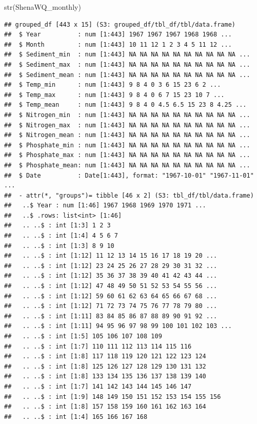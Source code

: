 \documentclass[
  12pt,
]{article}
\newenvironment{Shaded}{\begin{snugshade}}{\end{snugshade}}
\newcommand{\FunctionTok}[1]{\textcolor[rgb]{0.00,0.00,0.00}{#1}}
\newcommand{\NormalTok}[1]{#1}
\begin{document}
\begin{Shaded}
\begin{Highlighting}[]
\FunctionTok{str}\NormalTok{(ShenaWQ\_monthly)}
\end{Highlighting}
\end{Shaded}

\begin{verbatim}
## grouped_df [443 x 15] (S3: grouped_df/tbl_df/tbl/data.frame)
##  $ Year          : num [1:443] 1967 1967 1967 1968 1968 ...
##  $ Month         : num [1:443] 10 11 12 1 2 3 4 5 11 12 ...
##  $ Sediment_min  : num [1:443] NA NA NA NA NA NA NA NA NA NA ...
##  $ Sediment_max  : num [1:443] NA NA NA NA NA NA NA NA NA NA ...
##  $ Sediment_mean : num [1:443] NA NA NA NA NA NA NA NA NA NA ...
##  $ Temp_min      : num [1:443] 9 8 4 0 3 6 15 23 6 2 ...
##  $ Temp_max      : num [1:443] 9 8 4 0 6 7 15 23 10 7 ...
##  $ Temp_mean     : num [1:443] 9 8 4 0 4.5 6.5 15 23 8 4.25 ...
##  $ Nitrogen_min  : num [1:443] NA NA NA NA NA NA NA NA NA NA ...
##  $ Nitrogen_max  : num [1:443] NA NA NA NA NA NA NA NA NA NA ...
##  $ Nitrogen_mean : num [1:443] NA NA NA NA NA NA NA NA NA NA ...
##  $ Phosphate_min : num [1:443] NA NA NA NA NA NA NA NA NA NA ...
##  $ Phosphate_max : num [1:443] NA NA NA NA NA NA NA NA NA NA ...
##  $ Phosphate_mean: num [1:443] NA NA NA NA NA NA NA NA NA NA ...
##  $ Date          : Date[1:443], format: "1967-10-01" "1967-11-01" ...
##  - attr(*, "groups")= tibble [46 x 2] (S3: tbl_df/tbl/data.frame)
##   ..$ Year : num [1:46] 1967 1968 1969 1970 1971 ...
##   ..$ .rows: list<int> [1:46] 
##   .. ..$ : int [1:3] 1 2 3
##   .. ..$ : int [1:4] 4 5 6 7
##   .. ..$ : int [1:3] 8 9 10
##   .. ..$ : int [1:12] 11 12 13 14 15 16 17 18 19 20 ...
##   .. ..$ : int [1:12] 23 24 25 26 27 28 29 30 31 32 ...
##   .. ..$ : int [1:12] 35 36 37 38 39 40 41 42 43 44 ...
##   .. ..$ : int [1:12] 47 48 49 50 51 52 53 54 55 56 ...
##   .. ..$ : int [1:12] 59 60 61 62 63 64 65 66 67 68 ...
##   .. ..$ : int [1:12] 71 72 73 74 75 76 77 78 79 80 ...
##   .. ..$ : int [1:11] 83 84 85 86 87 88 89 90 91 92 ...
##   .. ..$ : int [1:11] 94 95 96 97 98 99 100 101 102 103 ...
##   .. ..$ : int [1:5] 105 106 107 108 109
##   .. ..$ : int [1:7] 110 111 112 113 114 115 116
##   .. ..$ : int [1:8] 117 118 119 120 121 122 123 124
##   .. ..$ : int [1:8] 125 126 127 128 129 130 131 132
##   .. ..$ : int [1:8] 133 134 135 136 137 138 139 140
##   .. ..$ : int [1:7] 141 142 143 144 145 146 147
##   .. ..$ : int [1:9] 148 149 150 151 152 153 154 155 156
##   .. ..$ : int [1:8] 157 158 159 160 161 162 163 164
##   .. ..$ : int [1:4] 165 166 167 168

\end{verbatim}
\end{document}

